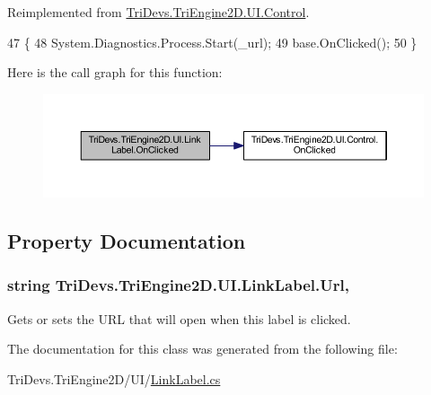Reimplemented from \hyperlink{class_tri_devs_1_1_tri_engine2_d_1_1_u_i_1_1_control_aa5d2b95535bb697420b640e5db72bc48}{Tri\-Devs.\-Tri\-Engine2\-D.\-U\-I.\-Control}.


\begin{DoxyCode}
47         \{
48             System.Diagnostics.Process.Start(\_url);
49             base.OnClicked();
50         \}
\end{DoxyCode}


Here is the call graph for this function\-:\nopagebreak
\begin{figure}[H]
\begin{center}
\leavevmode
\includegraphics[width=350pt]{class_tri_devs_1_1_tri_engine2_d_1_1_u_i_1_1_link_label_adcc511e03ec0c880cdff37947178a756_cgraph}
\end{center}
\end{figure}




\subsection{Property Documentation}
\hypertarget{class_tri_devs_1_1_tri_engine2_d_1_1_u_i_1_1_link_label_ad05f4d55ad4c170752367321a4a4837f}{
\subsubsection[{Url}]{\setlength{\rightskip}{0pt plus 5cm}string Tri\-Devs.\-Tri\-Engine2\-D.\-U\-I.\-Link\-Label.\-Url\hspace{0.3cm}{\ttfamily [get]}, {\ttfamily [set]}}}\label{class_tri_devs_1_1_tri_engine2_d_1_1_u_i_1_1_link_label_ad05f4d55ad4c170752367321a4a4837f}


Gets or sets the U\-R\-L that will open when this label is clicked. 



The documentation for this class was generated from the following file\-:\begin{DoxyCompactItemize}
\item 
Tri\-Devs.\-Tri\-Engine2\-D/\-U\-I/\hyperlink{_link_label_8cs}{Link\-Label.\-cs}\end{DoxyCompactItemize}

